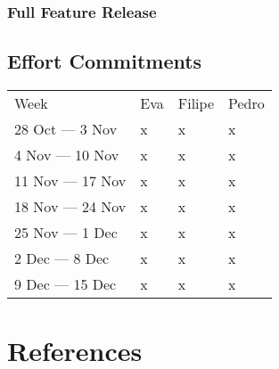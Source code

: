 \documentclass[a4paper]{article}
\begin{document}
\subsubsection{Full Feature Release}

\subsection{Effort Commitments}

\begin{tabular}{llll}
    Week & Eva & Filipe & Pedro\\
    28 Oct --- 3 Nov & x & x & x\\
    4 Nov --- 10 Nov & x & x & x\\
    11 Nov --- 17 Nov & x & x & x\\
    18 Nov --- 24 Nov & x & x & x\\
    25 Nov --- 1 Dec & x & x & x\\
    2 Dec --- 8 Dec & x & x & x\\
    9 Dec --- 15 Dec & x & x & x\\
\end{tabular}

\section{References}
\end{document}
